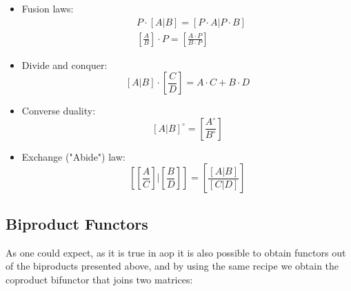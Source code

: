 \documentclass[
  oneside,
  11pt, a4paper,
  footinclude=true,
  headinclude=true,
  cleardoublepage=empty
]{scrbook}
\theoremstyle{definition}
\theoremstyle{definition}
\begin{document}
        \begin{itemize}
            \item Fusion laws:
            \begin{align}\label{fusion}
                & P \cdot \left[A|B\right] = \left[P \cdot A | P \cdot B\right] \\
                & \left[\frac{A}{B}\right] \cdot P = \left[\frac{A \cdot P}{B \cdot P}\right]
            \end{align}
            \item Divide and conquer:
            \begin{equation}\label{div-conq}
                \left[A | B\right] \cdot \left[\frac{C}{D}\right] = A \cdot C + B \cdot D
            \end{equation}
            \item Converse duality:
            \begin{equation}
                \left[A | B\right]^\circ = \left[\frac{A^\circ}{B^\circ}\right]
            \end{equation}
            \item Exchange ("Abide") law:
            \begin{equation}\label{abide}
                \left[\left[\frac{A}{C}\right] | \left[\frac{B}{D}\right]\right] = \left[\frac{\left[A | B\right]}{\left[C | D\right]}\right]
            \end{equation}
        \end{itemize}{}
        
        \subsection{Biproduct Functors}
        
        As one could expect, as it is true in \gls{aop} it is also possible to obtain functors out of the biproducts presented above, and by using the same recipe we obtain the coproduct bifunctor that joins two matrices:
        
        \begin{center}
        \end{center}{}
        
\end{document}

